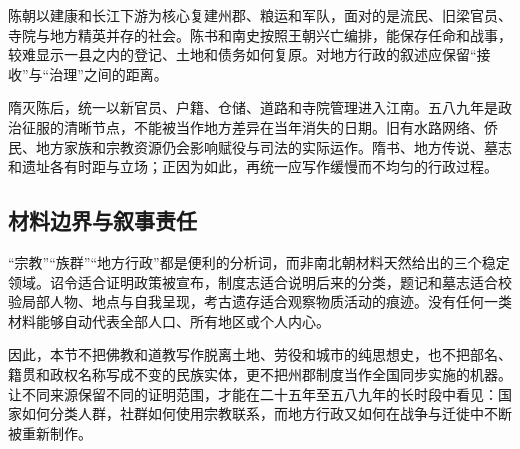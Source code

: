 陈朝以建康和长江下游为核心复建州郡、粮运和军队，面对的是流民、旧梁官员、寺院与地方精英并存的社会。陈书和南史按照王朝兴亡编排，能保存任命和战事，较难显示一县之内的登记、土地和债务如何复原。对地方行政的叙述应保留“接收”与“治理”之间的距离。

隋灭陈后，统一以新官员、户籍、仓储、道路和寺院管理进入江南。五八九年是政治征服的清晰节点，不能被当作地方差异在当年消失的日期。旧有水路网络、侨民、地方家族和宗教资源仍会影响赋役与司法的实际运作。隋书、地方传说、墓志和遗址各有时距与立场；正因为如此，再统一应写作缓慢而不均匀的行政过程。

\subsection{材料边界与叙事责任}

“宗教”“族群”“地方行政”都是便利的分析词，而非南北朝材料天然给出的三个稳定领域。诏令适合证明政策被宣布，制度志适合说明后来的分类，题记和墓志适合校验局部人物、地点与自我呈现，考古遗存适合观察物质活动的痕迹。没有任何一类材料能够自动代表全部人口、所有地区或个人内心。

因此，本节不把佛教和道教写作脱离土地、劳役和城市的纯思想史，也不把部名、籍贯和政权名称写成不变的民族实体，更不把州郡制度当作全国同步实施的机器。让不同来源保留不同的证明范围，才能在二十五年至五八九年的长时段中看见：国家如何分类人群，社群如何使用宗教联系，而地方行政又如何在战争与迁徙中不断被重新制作。
